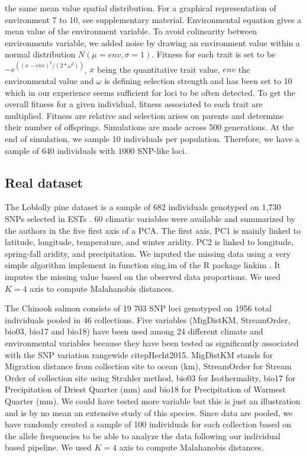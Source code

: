 \documentclass[nogrid]{MBE}%
\begin{document}
the same mean value spatial distribution. For a graphical representation of environment 7 to 10, see supplementary material. Environmental equation gives a mean value of the environment variable. To avoid colinearity between environments variable, we added noise by drawing an environment value within a normal distribution $N(\mu=env, \sigma=1)$. Fitness for each trait is set to be $-e^{((x-env)^2/(2*\omega^2))}$, $x$ being the quantitative trait value, $env$ the environmental value and $\omega$ is defining selection strength and has been set to 10 which in our experience seems sufficient for loci to be often detected. To get the overall fitness for a given individual, fitness associated to each trait are multiplied. Fitness are relative and selection arises on parents and determine their number of offsprings. Simulations are made across 500 generations. At the end of simulation, we sample 10 individuals per population. Therefore, we have a sample of 640 individuals with 1000 SNP-like loci.

\subsection{Real dataset}
The Loblolly pine dataset is a sample of 682 individuals genotyped on 1,730 SNPs selected in ESTs \citep{Eckert2010}. 60 climatic variables were available and summarized by the authors in the five first axis of a PCA. The first axis, PC1 is mainly linked to latitude, longitude, temperature, and winter aridity. PC2 is linked to longitude, spring-fall aridity, and precipitation. We inputed the missing data using a very simple algorithm implement in function sing.im of the R package linkim \citep{Lachenbruch2011}. It imputes the missing value based on the observed data proportions.  We used $K=4$ axis to compute Malahanobis distances.

The Chinook salmon consists of 19 703 SNP loci genotyped on 1956 total individuals pooled in 46 collections. Five variables (MigDistKM, StreamOrder, bio03, bio17 and bio18) have been used among  24 different climate and environmental variables because they have been tested as significantly associated with the SNP variation rangewide citep{Hecht2015}. MigDistKM stands for Migration distance from collection site to ocean (km),
StreamOrder for Stream Order of collection site using Strahler method, bio03 for Isothermality, bio17 for Precipitation of Driest Quarter (mm) and bio18 for Precipitation of Warmest Quarter (mm). We could have tested more variable but this is just an illustration and is by no mean an extensive study of this species. Since data are pooled, we have randomly created a sample of 100 individuals for each collection based on the allele frequencies to be able to analyze the data following our individual based pipeline. We used $K=4$ axis to compute Malahanobis distances.
\end{document}
